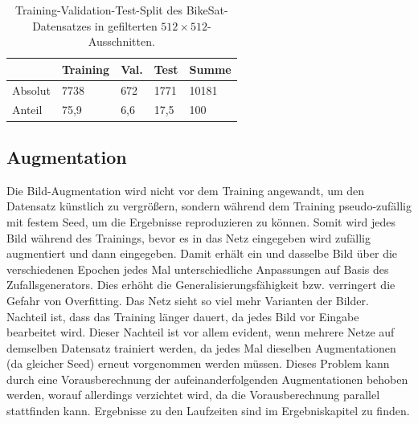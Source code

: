 \begin{table}
	\centering
	\begin{tabular}{l|l|l|l|l}
		& Training & Val. & Test & Summe \\
		\midrule
		Absolut & 7738 & 672 & 1771 & 10181 \\
		Anteil & 75,9 & 6,6 & 17,5 & 100 \\ 
	\end{tabular}
	\caption{Training-Validation-Test-Split des BikeSat-Datensatzes in gefilterten $512{\times}512$-Ausschnitten.}
	\label{tab:bike-split}
\end{table}


\subsection{Augmentation}

Die Bild-Augmentation wird nicht vor dem Training angewandt, um den Datensatz künstlich zu vergrößern, 
sondern während dem Training pseudo-zufällig mit festem Seed, um die Ergebnisse reproduzieren zu können.
Somit wird jedes Bild während des Trainings, bevor es in das Netz eingegeben wird zufällig augmentiert 
und dann eingegeben. Damit erhält ein und dasselbe Bild über die verschiedenen Epochen jedes Mal unterschiedliche 
Anpassungen auf Basis des Zufallsgenerators. Dies erhöht die Generalisierungsfähigkeit bzw. 
verringert die Gefahr von Overfitting. Das Netz sieht so viel mehr Varianten der Bilder. 
Nachteil ist, dass das Training länger dauert, da jedes Bild vor Eingabe bearbeitet wird. 
Dieser Nachteil ist vor allem evident, wenn mehrere Netze auf demselben Datensatz trainiert werden, da jedes Mal 
dieselben Augmentationen (da gleicher Seed) erneut vorgenommen werden müssen. Dieses Problem kann
durch eine Vorausberechnung der aufeinanderfolgenden Augmentationen behoben werden, worauf allerdings verzichtet wird,
da die Vorausberechnung parallel stattfinden kann. Ergebnisse zu den Laufzeiten sind im Ergebniskapitel zu finden. 


